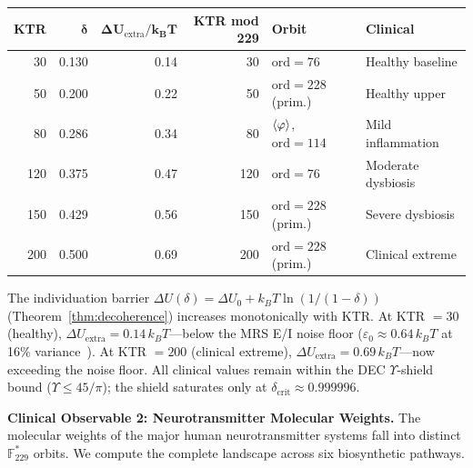 \begin{center}
\begin{tabular}{@{}rrrrll@{}}
\toprule
\textbf{KTR} & $\boldsymbol{\delta}$ & $\boldsymbol{\Delta U_{\mathrm{extra}}/k_BT}$
  & \textbf{KTR mod 229} & \textbf{Orbit} & \textbf{Clinical} \\
\midrule
30  & 0.130 & 0.14 & 30  & $\mathrm{ord}=76$        & Healthy baseline \\
50  & 0.200 & 0.22 & 50  & $\mathrm{ord}=228$ (prim.)& Healthy upper \\
80  & 0.286 & 0.34 & 80  & $\langle\varphi\rangle$, $\mathrm{ord}=114$ & Mild inflammation \\
120 & 0.375 & 0.47 & 120 & $\mathrm{ord}=76$        & Moderate dysbiosis \\
150 & 0.429 & 0.56 & 150 & $\mathrm{ord}=228$ (prim.)& Severe dysbiosis \\
200 & 0.500 & 0.69 & 200 & $\mathrm{ord}=228$ (prim.)& Clinical extreme \\
\bottomrule
\end{tabular}
\end{center}

The individuation barrier $\Delta U(\delta) = \Delta U_0 + k_BT\ln(1/(1-\delta))$
(Theorem~\ref{thm:decoherence}) increases monotonically with KTR.
At KTR $= 30$ (healthy), $\Delta U_\mathrm{extra} = 0.14\,k_BT$---below
the MRS E/I noise floor ($\varepsilon_0 \approx 0.64\,k_BT$
at 16\% variance~\cite{mrs_variance}). At KTR $= 200$ (clinical extreme),
$\Delta U_\mathrm{extra} = 0.69\,k_BT$---now exceeding the noise floor.
All clinical values remain within the DEC $\Upsilon$-shield bound
($\Upsilon \leq 45/\pi$); the shield saturates only at
$\delta_\mathrm{crit} \approx 0.999996$.

\textbf{Clinical Observable 2: Neurotransmitter Molecular Weights.}
The molecular weights of the major human neurotransmitter systems
fall into distinct $\mathbb{F}_{229}^*$ orbits. We compute the complete
landscape across six biosynthetic pathways.

